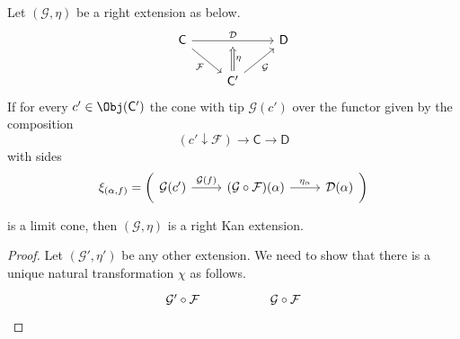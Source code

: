 \documentclass[notes.tex]{subfiles}
\begin{document}
\begin{lemma}
  \label{lemma:extension_whose_cones_are_limits_is_kan}
  Let $(\mathcal{G}, \eta)$ be a right extension as below.
  \begin{equation*}
    \begin{tikzcd}
      \mathsf{C}
      \arrow[dr, swap, "\mathcal{F}"]
      \arrow[rr, "\mathcal{D}", ""'{name=U}]
      && \mathsf{D}
      \\
      & \mathsf{C'}
      \arrow[ur, swap, "\mathcal{G}"]
      \arrow[d, to=U, Rightarrow, swap, "\eta"]
    \end{tikzcd}
  \end{equation*}
  If for every $c' \in \Obj(\mathsf{C'})$ the cone with tip $\mathcal{G}(c')$ over the functor given by the composition
  \begin{equation*}
    (c' \downarrow \mathcal{F}) \to \mathsf{C} \to \mathsf{D}
  \end{equation*}
  with sides
  \begin{equation*}
    \xi_{(\alpha, f)} = \left( \begin{tikzcd} \mathcal{G}(c') \arrow[r, "\mathcal{G}(f)"] & (\mathcal{G} \circ \mathcal{F})(\alpha) \arrow[r, "\eta_{\alpha}"] & \mathcal{D}(\alpha) \end{tikzcd} \right)
  \end{equation*}

  is a limit cone, then $(\mathcal{G}, \eta)$ is a right Kan extension.
\end{lemma}
\begin{proof}
  Let $(\mathcal{G}', \eta')$ be any other extension. We need to show that there is a unique natural transformation $\chi$ as follows.
  \begin{equation*}
    \begin{tikzcd}
      \mathcal{G}' \circ \mathcal{F}
      && \mathcal{G} \circ \mathcal{F}
    \end{tikzcd}
  \end{equation*}
\end{proof}
\end{document}
